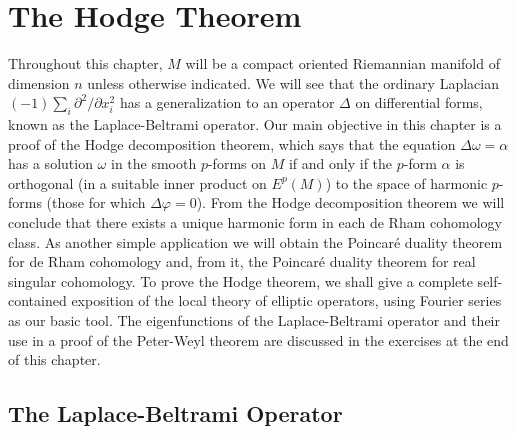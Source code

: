 \chapter{The Hodge Theorem}


Throughout this chapter, $M$ will be a compact oriented Riemannian manifold of dimension $n$ unless otherwise indicated. We will see that the ordinary Laplacian $(-1)\sum_{i}\partial^{2}/\partial x_{i}^{2}$ has a generalization to an operator $\Delta$ on differential forms, known as the Laplace-Beltrami operator. Our main objective in this chapter is a proof of the Hodge decomposition theorem, which says that the equation $\Delta\omega=\alpha$ has a solution $\omega$ in the smooth $p$-forms on $M$ if and only if the $p$-form $\alpha$ is orthogonal (in a suitable inner product on $E^{p}(M)$) to the space of harmonic $p$-forms (those for which $\Delta\varphi=0$). From the Hodge decomposition theorem we will conclude that there exists a unique harmonic form in each de Rham cohomology class. As another simple application we will obtain the Poincaré duality theorem for de Rham cohomology and, from it, the Poincaré duality theorem for real singular cohomology. To prove the Hodge theorem, we shall give a complete self-contained exposition of the local theory of elliptic operators, using Fourier series as our basic tool. The eigenfunctions of the Laplace-Beltrami operator and their use in a proof of the Peter-Weyl theorem are discussed in the exercises at the end of this chapter. 

\section{The Laplace-Beltrami Operator}


